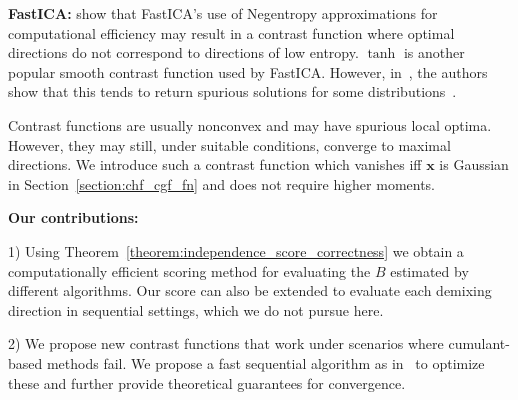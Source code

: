 \documentclass[letterpaper]{article}
\newcommand{\bx}{\pmb{x}}
\begin{document}
    \textbf{FastICA: } \cite{issoglio2021estimation} show that FastICA's use of Negentropy approximations for computational efficiency may result in a contrast function where optimal directions do not correspond to directions of low entropy. $\tanh$ is another popular smooth contrast function used by FastICA. However, in~\cite{wei2017fastica}, the authors show that this tends to return spurious solutions for some distributions~\cite{wei2017fastica}.

Contrast functions are usually nonconvex and may have spurious local optima. However, they may still, under suitable conditions, converge to maximal directions. We introduce such a contrast function which vanishes iff $\bx$ is Gaussian in Section~\ref{section:chf_cgf_fn} and does not require higher moments.

\textbf{Our contributions:}

1) Using Theorem~\ref{theorem:independence_score_correctness} we obtain a computationally efficient scoring method for evaluating the $B$ estimated by different algorithms. Our score can also be extended to evaluate each demixing direction in sequential settings, which we do not pursue here.

2) We propose new contrast functions that work under scenarios where cumulant-based methods fail. We propose a fast sequential algorithm as in~\cite{NIPS2015_89f03f7d} to optimize these and further provide theoretical guarantees for convergence.
\end{document}
